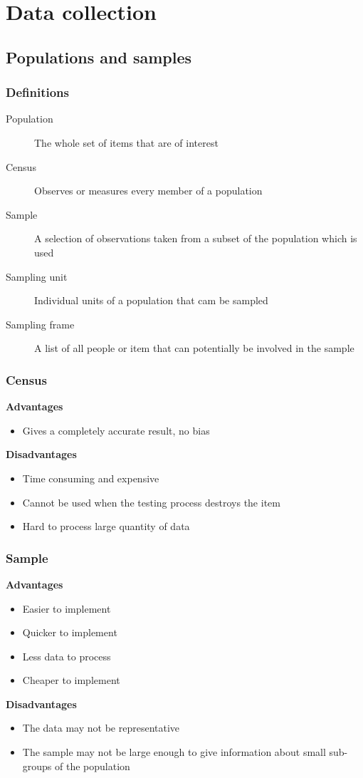 	\chapter{Data collection}
\section{Populations and samples}
\subsection{Definitions}
\begin{description}
	\item[Population] The whole set of items that are of interest
	\item[Census] Observes or measures every member of a population
	\item[Sample] A selection of observations taken from a subset of the population which is used
	\item[Sampling unit] Individual units of a population that cam be sampled
	\item[Sampling frame] A list of all people or item that can potentially be involved in the sample
\end{description}

\subsection{Census}
\textbf{Advantages}
\begin{itemize}
	\item Gives a completely accurate result, no bias
\end{itemize}
\textbf{Disadvantages}
\begin{itemize}
	\item Time consuming and expensive
	\item Cannot be used when the testing process destroys the item
	\item Hard to process large quantity of data
\end{itemize}
\subsection{Sample}
\textbf{Advantages}
\begin{itemize}
	\item Easier to implement
	\item Quicker to implement
	\item Less data to process
	\item Cheaper to implement
\end{itemize}
\textbf{Disadvantages}
\begin{itemize}
	\item The data may not be representative
	\item The sample may not be large enough to give information about small sub-groups of the population
\end{itemize}
